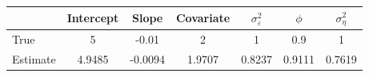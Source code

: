 \begin{tabular}{lcccccc}
\toprule
& Intercept & Slope & Covariate & $\sigma_\varepsilon^2$ & $\phi$ & $\sigma_\eta^2$ \\
\midrule
True & 5 & -0.01 & 2 & 1 & 0.9 & 1 \\
Estimate & 4.9485 & -0.0094 & 1.9707 & 0.8237 & 0.9111 & 0.7619 \\
\bottomrule
\end{tabular}
